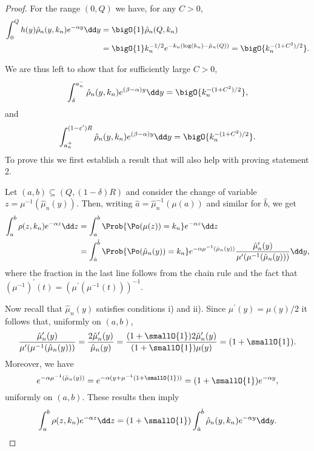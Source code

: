 \begin{proof}
For the range $(0,Q)$ we have, for any $C > 0$,
\begin{align*}
	\int_0^Q h(y) \hat{\rho}_n(y,k_n) e^{-\alpha y} \dd y
	&= \bigO{1} \hat{\rho}_n(Q, k_n) \\
	&= \bigO{1} k_n^{-1/2} e^{-k_n(\log(k_n)-\hat{\mu}_n(Q))} = \bigO{k_n^{-(1+C^2)/2}}.
\end{align*}

We are thus left to show that for sufficiently large $C > 0$,
\begin{equation}\label{eq:concentration_argument_an_-}
	 \int_\delta^{a_n^-} \hat{\rho}_n(y,k_n) e^{(\beta-\alpha) y} \dd y = \bigO{k_n^{-(1+C^2)/2}},
\end{equation}
and
\begin{equation}\label{eq:concentration_argument_an_+}
	\int_{a_n^+}^{(1-\varepsilon^\prime)R} \hat{\rho}_n(y,k_n) e^{(\beta-\alpha) y} \dd y = \bigO{k_n^{-(1+C^2)/2}}.
\end{equation}
To prove this we first establish a result that will also help with proving statement 2. 

Let $(a, b) \subseteq (Q,(1-\delta)R)$ and consider the change of variable $z = \mu^{-1}(\hat{\mu}_n(y))$. Then, writing $\hat{a} = \hat{\mu}_n^{-1}(\mu(a))$ and similar for $\hat{b}$, we get
\begin{align*}
	\int_{a}^{b} \rho(z,k_n) e^{-\alpha z} \dd z 
	&= \int_{a}^{b} \Prob{\Po(\mu(z)) = k_n} e^{-\alpha z} \dd z\\
	&= \int_{\hat{a}}^{\hat{b}} \Prob{\Po(\hat{\mu}_n(y)) = k_n} e^{-\alpha \mu^{-1}(\hat{\mu}_n(y))} 
		\frac{\hat{\mu}_n^\prime(y)}{\mu^\prime(\mu^{-1}(\hat{\mu}_n(y)))} \dd y,
\end{align*}
where the fraction in the last line follows from the chain rule and the fact that $(\mu^{-1})^\prime(t) = (\mu^\prime(\mu^{-1}(t)))^{-1}$.

Now recall that $\hat{\mu}_n(y)$ satisfies conditions i) and ii). Since $\mu^\prime(y) = \mu(y)/2$ it follows that, uniformly on $(a,b)$,
\[
	\frac{\hat{\mu}_n^\prime(y)}{\mu^\prime(\mu^{-1}(\hat{\mu}_n(y)))}
	= \frac{2\hat{\mu}_n^\prime(y)}{\hat{\mu}_n(y)}
	= \frac{(1 + \smallO{1})2\hat{\mu}_n^\prime(y)}{(1 + \smallO{1})\mu(y)}
	= (1+\smallO{1}).
\]
Moreover, we have
\[
	e^{-\alpha \mu^{-1}(\hat{\mu}_n(y))} = e^{-\alpha (y + \mu^{-1}(1+\smallO{1}))} = (1+\smallO{1})e^{-\alpha y},
\]
uniformly on $(a,b)$. These results then imply
\begin{equation}\label{eq:equivalence_integral_rho_change_variables}
	\int_{a}^{b} \rho(z,k_n) e^{-\alpha z} \dd z 
	= (1+\smallO{1}) \int_{\hat{a}}^{\hat{b}} \hat{\rho}_n(y,k_n) e^{-\alpha y} \dd y.
\end{equation}


\end{proof}
